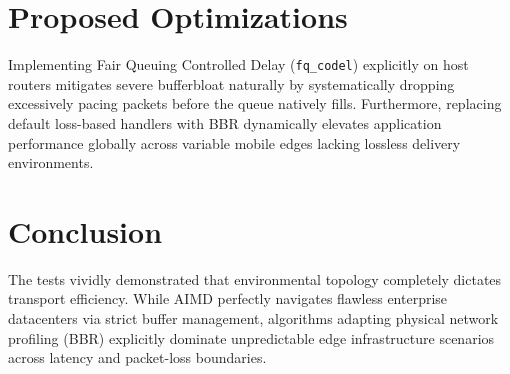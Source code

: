 \documentclass[12pt,a4paper]{article}
\begin{document}
\section{Proposed Optimizations}
Implementing Fair Queuing Controlled Delay (\texttt{fq\_codel}) explicitly on host routers mitigates severe bufferbloat naturally by systematically dropping excessively pacing packets before the queue natively fills. Furthermore, replacing default loss-based handlers with BBR dynamically elevates application performance globally across variable mobile edges lacking lossless delivery environments.

\section{Conclusion}
The tests vividly demonstrated that environmental topology completely dictates transport efficiency. While AIMD perfectly navigates flawless enterprise datacenters via strict buffer management, algorithms adapting physical network profiling (BBR) explicitly dominate unpredictable edge infrastructure scenarios across latency and packet-loss boundaries.
\end{document}
